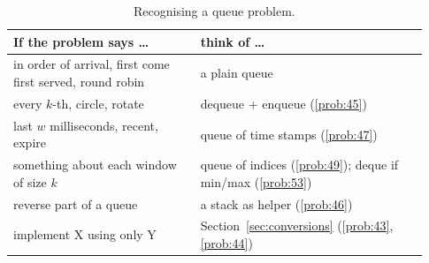\begin{table}[ht]\centering\small
\begin{tabular}{@{}p{0.42\linewidth}p{0.51\linewidth}@{}}\toprule
If the problem says \dots & think of \dots\\\midrule
in order of arrival, first come first served, round robin & a plain queue\\
every $k$-th, circle, rotate & dequeue + enqueue (\ref{prob:45})\\
last $w$ milliseconds, recent, expire & queue of time stamps (\ref{prob:47})\\
something about each window of size $k$ & queue of indices (\ref{prob:49}); deque if min/max (\ref{prob:53})\\
reverse part of a queue & a stack as helper (\ref{prob:46})\\
implement X using only Y & Section~\ref{sec:conversions} (\ref{prob:43}, \ref{prob:44})\\\bottomrule
\end{tabular}
\caption{Recognising a queue problem.}
\end{table}

